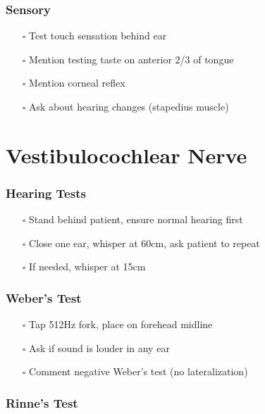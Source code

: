 \documentclass[
  13.5pt,
  a4paper,
  DIV=11,
  numbers=noendperiod]{scrreprt}
\providecommand{\tightlist}{%
  \setlength{\itemsep}{0pt}\setlength{\parskip}{0pt}}
\begin{document}
\subsubsection{Sensory}\label{sensory-1}

\begin{itemize}
\tightlist
\item[$\square$]
  Test touch sensation behind ear
\item[$\square$]
  Mention testing taste on anterior 2/3 of tongue
\item[$\square$]
  Mention corneal reflex
\item[$\square$]
  Ask about hearing changes (stapedius muscle)
\end{itemize}

\section{Vestibulocochlear Nerve}\label{vestibulocochlear-nerve}

\subsubsection{Hearing Tests}\label{hearing-tests}

\begin{itemize}
\tightlist
\item[$\square$]
  Stand behind patient, ensure normal hearing first
\item[$\square$]
  Close one ear, whisper at 60cm, ask patient to repeat
\item[$\square$]
  If needed, whisper at 15cm
\end{itemize}

\subsubsection{Weber's Test}\label{webers-test}

\begin{itemize}
\tightlist
\item[$\square$]
  Tap 512Hz fork, place on forehead midline
\item[$\square$]
  Ask if sound is louder in any ear
\item[$\square$]
  Comment negative Weber's test (no lateralization)
\end{itemize}

\subsubsection{Rinne's Test}\label{rinnes-test}
\end{document}
